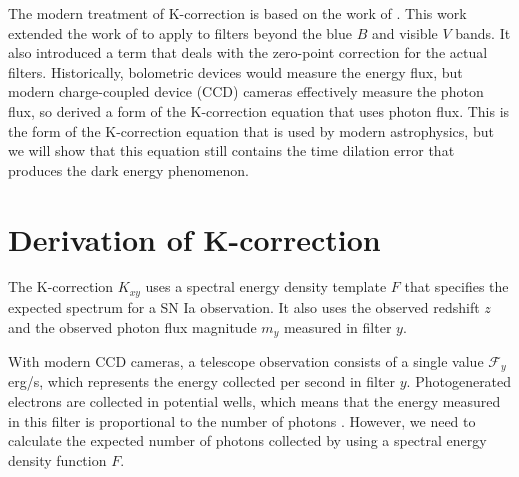 The modern treatment of K-correction is based on the work of \citet{kim1996}.
This work extended the work of \citet{oke1968} to apply to filters beyond the
blue $B$ and visible $V$ bands. It also introduced a term that deals with the
zero-point correction for the actual filters. Historically, bolometric devices
would measure the energy flux, but modern charge-coupled device (CCD) cameras
effectively measure the photon flux, so \citet{kim1996} derived a form of the
K-correction equation that uses photon flux. This is the form of the
K-correction equation that is used by modern astrophysics, but we will show
that this equation still contains the time dilation error that produces the
dark energy phenomenon.

\section{Derivation of K-correction}

The K-correction $K_{xy}$ uses a spectral energy density template $F$ that
specifies the expected spectrum for a SN Ia observation. It also uses the
observed redshift $z$ and the observed photon flux magnitude $m_y$ measured in
filter $y$.

With modern CCD cameras, a telescope observation consists of a single value
$\mathcal{F}_y$ erg/s, which represents the energy collected per second in
filter $y$. Photogenerated electrons are collected in potential wells, which
means that the energy measured in this filter is proportional to the number of
photons \citep{lesser2015}. However, we need to calculate the expected number
of photons collected by using a spectral energy density function $F$.

